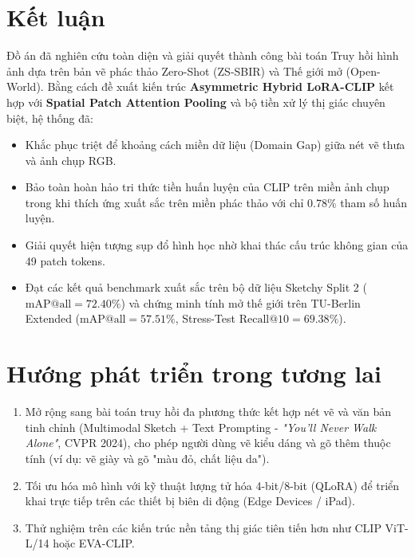 \documentclass[12pt,a4paper]{report}
\begin{document}
\section{Kết luận}
Đồ án đã nghiên cứu toàn diện và giải quyết thành công bài toán Truy hồi hình ảnh dựa trên bản vẽ phác thảo Zero-Shot (ZS-SBIR) và Thế giới mở (Open-World). Bằng cách đề xuất kiến trúc \textbf{Asymmetric Hybrid LoRA-CLIP} kết hợp với \textbf{Spatial Patch Attention Pooling} và bộ tiền xử lý thị giác chuyên biệt, hệ thống đã:
\begin{itemize}
    \item Khắc phục triệt để khoảng cách miền dữ liệu (Domain Gap) giữa nét vẽ thưa và ảnh chụp RGB.
    \item Bảo toàn hoàn hảo tri thức tiền huấn luyện của CLIP trên miền ảnh chụp trong khi thích ứng xuất sắc trên miền phác thảo với chỉ 0.78\% tham số huấn luyện.
    \item Giải quyết hiện tượng sụp đổ hình học nhờ khai thác cấu trúc không gian của 49 patch tokens.
    \item Đạt các kết quả benchmark xuất sắc trên bộ dữ liệu Sketchy Split 2 ($\text{mAP@all} = \mathbf{72.40\%}$) và chứng minh tính mở thế giới trên TU-Berlin Extended ($\text{mAP@all} = \mathbf{57.51\%}$, Stress-Test $\text{Recall@10} = \mathbf{69.38\%}$).
\end{itemize}

\section{Hướng phát triển trong tương lai}
\begin{enumerate}
    \item Mở rộng sang bài toán truy hồi đa phương thức kết hợp nét vẽ và văn bản tinh chỉnh (Multimodal Sketch + Text Prompting - \textit{"You'll Never Walk Alone"}, CVPR 2024), cho phép người dùng vẽ kiểu dáng và gõ thêm thuộc tính (ví dụ: vẽ giày và gõ "màu đỏ, chất liệu da").
    \item Tối ưu hóa mô hình với kỹ thuật lượng tử hóa 4-bit/8-bit (QLoRA) để triển khai trực tiếp trên các thiết bị biên di động (Edge Devices / iPad).
    \item Thử nghiệm trên các kiến trúc nền tảng thị giác tiên tiến hơn như CLIP ViT-L/14 hoặc EVA-CLIP.
\end{enumerate}
\end{document}
